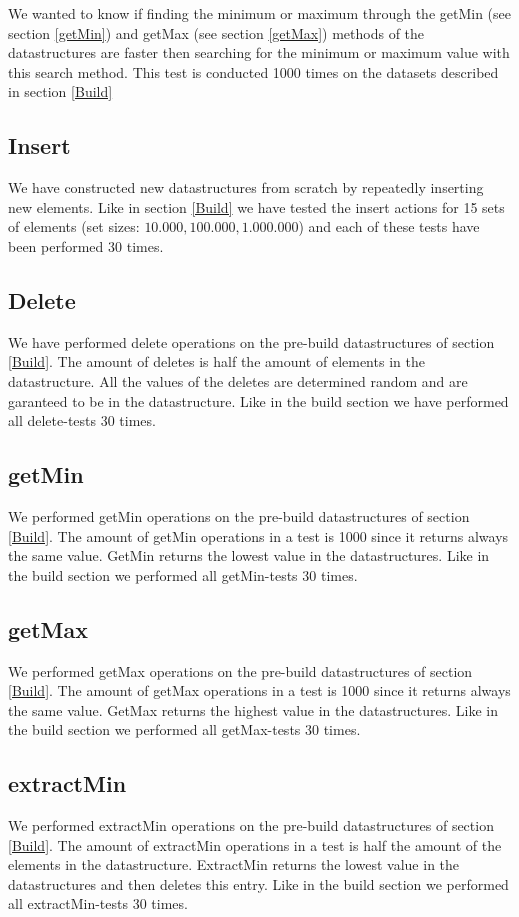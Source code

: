\documentclass{article}
\begin{document}
We wanted to know if finding the minimum or maximum through the getMin (see section \ref{getMin}) and getMax (see section \ref{getMax}) methods of the datastructures are faster then searching for the minimum or maximum value with this search method. This test is conducted 1000 times on the datasets described in section \ref{Build}
\subsection{Insert}
We have constructed new datastructures from scratch by repeatedly inserting new elements. Like in section \ref{Build} we have tested the insert actions for 15 sets of elements (set sizes: $10.000, 100.000, 1.000.000$) and each of these tests have been performed 30 times.
\subsection{Delete}
We have performed delete operations on the pre-build datastructures of section \ref{Build}. The amount of deletes is half the amount of elements in the datastructure. All the values of the deletes are determined random and are garanteed to be in the datastructure. Like in the build section we have performed all delete-tests 30 times.
\subsection{getMin}
We performed getMin operations on the pre-build datastructures of section \ref{Build}. The amount of getMin operations in a test is 1000 since it returns always the same value. GetMin returns the lowest value in the datastructures. Like in the build section we performed all getMin-tests 30 times.
\label{getMin}
\subsection{getMax}
We performed getMax operations on the pre-build datastructures of section \ref{Build}. The amount of getMax operations in a test is 1000 since it returns always the same value. GetMax returns the highest value in the datastructures. Like in the build section we performed all getMax-tests 30 times.
\label{getMax}
\subsection{extractMin}
We performed extractMin operations on the pre-build datastructures of section \ref{Build}. The amount of extractMin operations in a test is half the amount of the elements in the datastructure. ExtractMin returns the lowest value in the datastructures and then deletes this entry. Like in the build section we performed all extractMin-tests 30 times.
\end{document}
